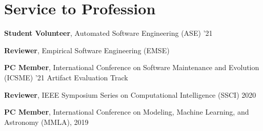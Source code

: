 \section{Service to Profession}
 \resumeSubHeadingListStart
    \item
      {\textbf{Student Volunteer}, Automated Software Engineering (ASE) '21}
    \item
      {\textbf{Reviewer}, Empirical Software Engineering (EMSE)}
    \item
      {\textbf{PC Member}, International Conference on Software Maintenance and Evolution (ICSME) '21 Artifact Evaluation Track}
    \item
      {\textbf{Reviewer}, IEEE Symposium Series on Computational Intelligence (SSCI) 2020}
    \item
      {\textbf{PC Member}, International Conference on Modeling, Machine Learning, and Astronomy (MMLA), 2019}
 \resumeSubHeadingListEnd